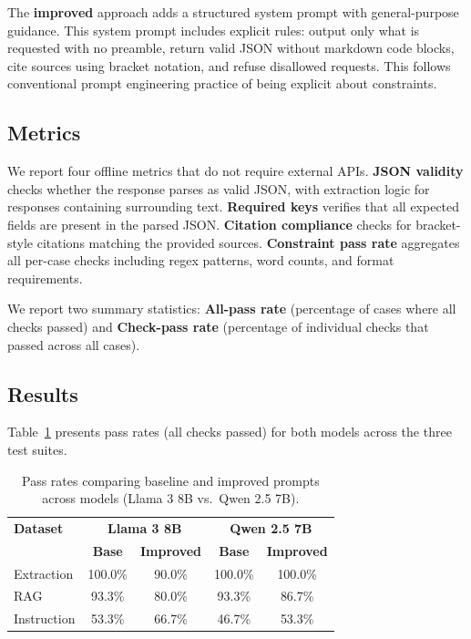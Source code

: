 The \textbf{improved} approach adds a structured system prompt with general-purpose guidance. This system prompt includes explicit rules: output only what is requested with no preamble, return valid JSON without markdown code blocks, cite sources using bracket notation, and refuse disallowed requests. This follows conventional prompt engineering practice of being explicit about constraints.

\subsection{Metrics}

We report four offline metrics that do not require external APIs. \textbf{JSON validity} checks whether the response parses as valid JSON, with extraction logic for responses containing surrounding text. \textbf{Required keys} verifies that all expected fields are present in the parsed JSON. \textbf{Citation compliance} checks for bracket-style citations matching the provided sources. \textbf{Constraint pass rate} aggregates all per-case checks including regex patterns, word counts, and format requirements.

We report two summary statistics: \textbf{All-pass rate} (percentage of cases where all checks passed) and \textbf{Check-pass rate} (percentage of individual checks that passed across all cases).

\subsection{Results}

Table~\ref{tab:exp-results} presents pass rates (all checks passed) for both models across the three test suites.

\begin{table}[h]
\centering
\caption{Pass rates comparing baseline and improved prompts across models (Llama 3 8B vs.\ Qwen 2.5 7B).}
\label{tab:exp-results}
\begin{tabular}{@{}l cc cc@{}}
\toprule
\textbf{Dataset} & \multicolumn{2}{c}{\textbf{Llama 3 8B}} & \multicolumn{2}{c}{\textbf{Qwen 2.5 7B}} \\
 & \textbf{Base} & \textbf{Improved} & \textbf{Base} & \textbf{Improved} \\
\midrule
Extraction & 100.0\% & 90.0\% & 100.0\% & 100.0\% \\
RAG & 93.3\% & 80.0\% & 93.3\% & 86.7\% \\
Instruction & 53.3\% & 66.7\% & 46.7\% & 53.3\% \\
\bottomrule
\end{tabular}
\end{table}

